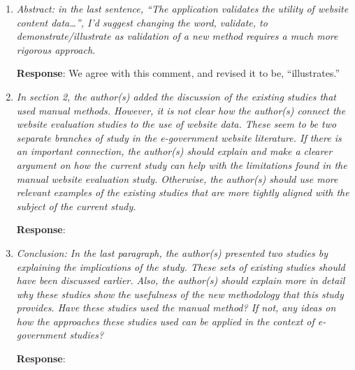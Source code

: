 \documentclass[12pt,titlepage]{article}
\begin{document}
\begin{enumerate}


\item \emph{ Abstract: in the last sentence, “The application validates the utility of website content data…”, I’d suggest changing the word, validate, to demonstrate/illustrate as validation of a new method requires a much more rigorous approach. } 

	\textbf{Response}: We agree with this comment, and revised it to be, ``illustrates.''
	
	\item \emph{ In section 2, the author(s) added the discussion of the existing studies that used manual methods. However, it is not clear how the author(s) connect the website evaluation studies to the use of website data. These seem to be two separate branches of study in the e-government website literature. If there is an important connection, the author(s) should explain and make a clearer argument on how the current study can help with the limitations found in the manual website evaluation study. Otherwise, the author(s) should use more relevant examples of the existing studies that are more tightly aligned with the subject of the current study. } 

	\textbf{Response}: 
	
	\item \emph{ Conclusion: In the last paragraph, the author(s) presented two studies by explaining the implications of the study. These sets of existing studies should have been discussed earlier. Also, the author(s) should explain more in detail why these studies show the usefulness of the new methodology that this study provides. Have these studies used the manual method? If not, any ideas on how the approaches these studies used can be applied in the context of e-government studies? } 

	\textbf{Response}: 



\end{enumerate}



%
% 
\end{document}

